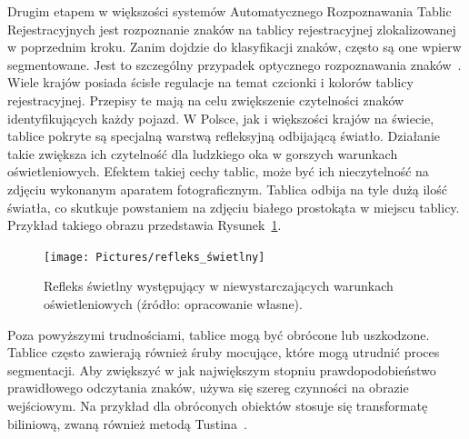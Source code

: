 Drugim etapem w większości systemów Automatycznego Rozpoznawania Tablic Rejestracyjnych jest rozpoznanie znaków na tablicy rejestracyjnej zlokalizowanej w poprzednim kroku.
Zanim dojdzie do klasyfikacji znaków, często są one wpierw segmentowane.
Jest to szczególny przypadek optycznego rozpoznawania znaków~\cite{9310202}.
Wiele krajów posiada ścisłe regulacje na temat czcionki i kolorów tablicy rejestracyjnej.
Przepisy te mają na celu zwiększenie czytelności znaków identyfikujących każdy pojazd.
W Polsce, jak i większości krajów na świecie, tablice pokryte są specjalną warstwą refleksyjną odbijającą światło.
Działanie takie zwiększa ich czytelność dla ludzkiego oka w gorszych warunkach oświetleniowych.
Efektem takiej cechy tablic, może być ich nieczytelność na zdjęciu wykonanym aparatem fotograficznym.
Tablica odbija na tyle dużą ilość światła, co skutkuje powstaniem na zdjęciu białego prostokąta w miejscu tablicy.
Przykład takiego obrazu przedstawia Rysunek~\ref{fig:refleks_swietlny}.
\begin{figure}[!ht]
    \centering
    \texttt{[image: Pictures/refleks\_świetlny]}
    \caption{Refleks świetlny występujący w niewystarczających warunkach oświetleniowych (źródło: opracowanie własne).}
    \label{fig:refleks_swietlny}
\end{figure}
\FloatBarrier
Poza powyższymi trudnościami, tablice mogą być obrócone lub uszkodzone.
Tablice często zawierają również śruby mocujące, które mogą utrudnić proces segmentacji.
Aby zwiększyć w jak największym stopniu prawdopodobieństwo prawidłowego odczytania znaków, używa się szereg czynności na obrazie wejściowym.
Na przykład dla obróconych obiektów stosuje się transformatę biliniową, zwaną również metodą Tustina~\cite{Xu2006AMO}.

